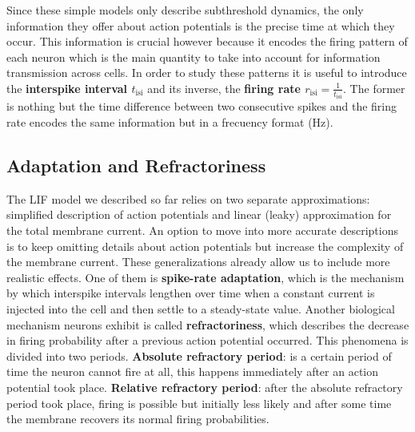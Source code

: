 \documentclass[titlepage]{article}
\begin{document}
Since these simple models only describe subthreshold dynamics, the only information they offer about action potentials is the precise time at which they occur. This information is crucial however because it encodes the firing pattern of each neuron which is the main quantity to take into account for information transmission across cells. In order to study these patterns it is useful to introduce the \textbf{interspike interval $t_{\text{isi}}$} and its inverse, the \textbf{firing rate $r_{\text{isi}} = \frac{1}{t_{\text{isi}}}$}. The former is nothing but the time difference between two consecutive spikes and the firing rate encodes the same information but in a frecuency format (Hz).

\subsection{Adaptation and Refractoriness}

The LIF model we described so far relies on two separate approximations: simplified description of action potentials and linear (leaky) approximation for the total membrane current. An option to move into more accurate descriptions is to keep omitting details about action potentials but increase the complexity of the membrane current. These generalizations already allow us to include more realistic effects. One of them is \textbf{spike-rate adaptation}, which is the mechanism by which interspike intervals lengthen over time when a constant current is injected into the cell and then settle to a steady-state value. Another biological mechanism neurons exhibit is called \textbf{refractoriness}, which describes the decrease in firing probability  after a previous action potential occurred. This phenomena is divided into two periods. \textbf{Absolute refractory period}: is a certain period of time the neuron cannot fire at all, this happens immediately after an action potential took place. \textbf{Relative refractory period}: after the absolute refractory period took place, firing is possible but initially less likely and after some time the membrane recovers its normal firing probabilities.
\end{document}
